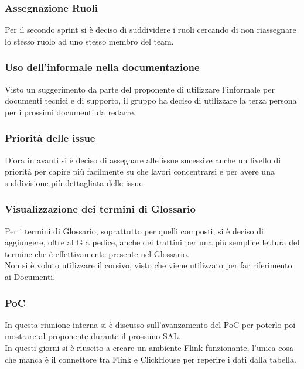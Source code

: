 \documentclass[10pt]{article}
\begin{document}
\subsubsection{Assegnazione Ruoli}
Per il secondo sprint si è deciso di suddividere i ruoli cercando di non riassegnare lo stesso ruolo ad uno stesso membro del team.

\subsubsection{Uso dell'informale nella documentazione}
Visto un suggerimento da parte del proponente di utilizzare l'informale per documenti tecnici e di supporto, il gruppo ha deciso di utilizzare la terza persona per i prossimi documenti da redarre.

\subsubsection{Priorità delle issue}
D'ora in avanti si è deciso di assegnare alle issue sucessive anche un livello di priorità per capire più facilmente su che lavori concentrarsi e per avere una suddivisione più dettagliata delle issue.

\subsubsection{Visualizzazione dei termini di Glossario}
Per i termini di Glossario, soprattutto per quelli composti, si è deciso di aggiungere, oltre al G a pedice, anche dei trattini per una più semplice lettura del termine che è effettivamente presente nel Glossario.\\
Non si è voluto utilizzare il corsivo, visto che viene utilizzato per far riferimento ai Documenti.

\subsubsection{PoC}
In questa riunione interna si è discusso sull'avanzamento del PoC per poterlo poi mostrare al proponente durante il prossimo SAL.\\
In questi giorni si è riuscito a creare un ambiente Flink funzionante, l'unica cosa che manca è il connettore tra Flink e ClickHouse per reperire i dati dalla tabella.
\end{document}
